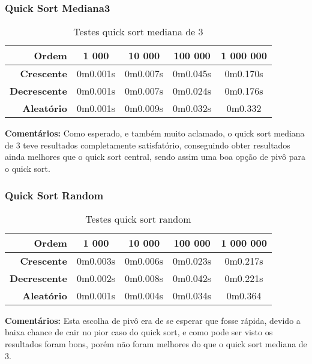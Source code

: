 \documentclass[
	12pt,				%
	oneside,			%
	a4paper,			%
	english,			%
	brazil,				%
	]{article}
\begin{document}
\subsubsection{Quick Sort Mediana3}
\begin{table}[H]
\centering
\begin{tabular}{|r|c|c|c|c|}
\cline{1-5} 
 \textbf{Ordem} & \textbf{1 000} & \textbf{10 000} & \textbf{100 000} & \textbf{1 000 000}\\
 \hline
 \textbf{Crescente} & 0m0.001s & 0m0.007s & 0m0.045s & 0m0.170s \\
 \hline
 \textbf{Decrescente} & 0m0.001s & 0m0.007s & 0m0.024s & 0m0.176s \\
 \hline
 \textbf{Aleat{\'o}rio} & 0m0.001s & 0m0.009s & 0m0.032s & 0m0.332 \\
 \hline
\end{tabular} 
\caption{Testes quick sort mediana de 3}
\end{table}
\indent \textbf{Comentários:} Como esperado, e também muito aclamado, o quick sort mediana de 3 teve resultados completamente satisfatório, conseguindo obter resultados
ainda melhores que o quick sort central, sendo assim uma boa opção de pivô para o quick sort.



\subsubsection{Quick Sort Random}
\begin{table}[H]
\centering
\begin{tabular}{|r|c|c|c|c|}
\cline{1-5} 
 \textbf{Ordem} & \textbf{1 000} & \textbf{10 000} & \textbf{100 000} & \textbf{1 000 000}\\
 \hline
 \textbf{Crescente} & 0m0.003s & 0m0.006s & 0m0.023s & 0m0.217s \\
 \hline
 \textbf{Decrescente} & 0m0.002s & 0m0.008s & 0m0.042s & 0m0.221s \\
 \hline
 \textbf{Aleat{\'o}rio} & 0m0.001s & 0m0.004s & 0m0.034s & 0m0.364 \\
 \hline
\end{tabular} 
\caption{Testes quick sort random}
\end{table}
\indent \textbf{Comentários:} Esta escolha de pivô era de se esperar que fosse rápida, devido a baixa chance de cair no pior caso do quick sort, e como pode ser visto
os resultados foram bons, porém não foram melhores do que o quick sort mediana de 3.
\end{document}
